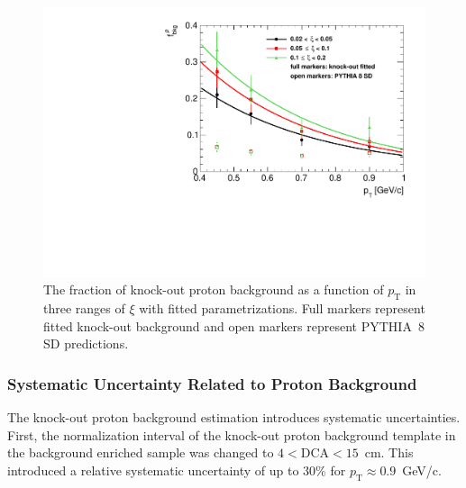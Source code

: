  \begin{figure}[h!]%
 	\centering
 	\includegraphics[width=0.8\linewidth, page=1]{chapters/chrgSTAR/img/DCAproton/bkg_p.pdf}
 	\caption{The fraction of knock-out proton background  as a function of $p_\textrm{T}$ in three ranges of $\xi$  with  fitted parametrizations. Full markers represent fitted knock-out background and open markers represent PYTHIA~8 SD predictions.}
 	\label{fig:bkg_proton_fit}
 \end{figure}

 
 \subsubsection{Systematic Uncertainty Related to Proton Background} 
The knock-out proton background estimation  introduces  systematic uncertainties. %
First, the normalization interval of the  knock-out   proton  background template in the background enriched sample was changed to $4<\textrm{DCA}<15$~cm. This introduced a relative systematic uncertainty of up to $30\%$ for $p_\textrm{T}\approx 0.9$~GeV/c. 

